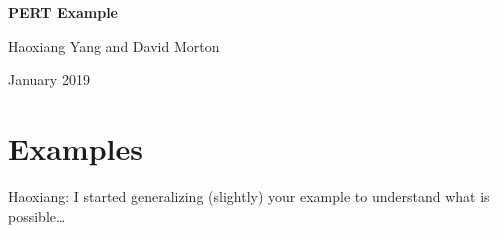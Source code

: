 \documentclass[11pt]{article}
\newcommand{\ms}{\medskip}
\newcommand{\bs}{\bigskip}
\begin{document}
\baselineskip0.20in

\begin{center}
\begin{large}

{\bf PERT Example} \bs

Haoxiang Yang and David Morton \ms

January 2019 \bs

\end{large}
\end{center}

\section*{Examples} 

\noindent Haoxiang: I started generalizing (slightly) your example to understand what is possible\ldots
\end{document}
